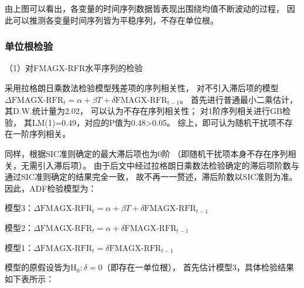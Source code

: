 \documentclass[UTF8]{ctexart}
\begin{document}
由上图可以看出，各变量的时间序列数据皆表现出围绕均值不断波动的过程，
因此可以推测各变量时间序列皆为平稳序列，不存在单位根。

\subsubsection{单位根检验}

（1）对FMAGX-RFR水平序列的检验

采用拉格朗日乘数法检验模型残差项的序列相关性，
对不引入滞后项的模型
$\Delta \text{FMAGX-RFR}_{t} = \alpha + \beta T +\delta \text{FMAGX-RFR}_{t-1}$。
首先进行普通最小二乘估计，
其D.W.统计量为2.02，
可以认为不存在序列相关性；
对1阶序列相关进行GB检验，
其LM(1)=0.49，对应的P值为0.48>0.05。
综上，即可认为随机干扰项不存在一阶序列相关。


同样，根据SIC准则确定的最大滞后项也为0阶
（即随机干扰项本身不存在序列相关，无需引入滞后项）。
由于后文中经过拉格朗日乘数法检验确定的滞后项阶数与通过SIC准则确定的结果完全一致，
故不再一一赘述，滞后阶数以SIC准则为准。
因此，ADF检验模型为：

模型3：$\Delta \text{FMAGX-RFR}_{t} = \alpha + \beta T +\delta \text{FMAGX-RFR}_{t-1}$

模型2：$\Delta \text{FMAGX-RFR}_{t} = \alpha + \delta  \text{FMAGX-RFR}_{t-1}$

模型1：$\Delta \text{FMAGX-RFR}_{t} = \delta \text{FMAGX-RFR}_{t-1}$


模型的原假设皆为$\text{H}_0:\delta=0$（即存在一单位根），
首先估计模型3，具体检验结果如下表所示：

\end{document}
